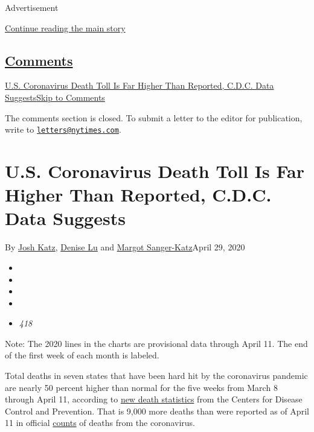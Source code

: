 Advertisement

\protect\hyperlink{after-top}{Continue reading the main story}

\hypertarget{comments}{%
\subsection{\texorpdfstring{\protect\hyperlink{commentsContainer}{Comments}}{Comments}}\label{comments}}

\href{}{U.S. Coronavirus Death Toll Is Far Higher Than Reported, C.D.C.
Data Suggests}\href{}{Skip to Comments}

The comments section is closed. To submit a letter to the editor for
publication, write to
\href{mailto:letters@nytimes.com}{\nolinkurl{letters@nytimes.com}}.

\hypertarget{us-coronavirus-death-toll-is-far-higher-than-reported-cdc-data-suggests}{%
\section{U.S. Coronavirus Death Toll Is Far Higher Than Reported, C.D.C.
Data
Suggests}\label{us-coronavirus-death-toll-is-far-higher-than-reported-cdc-data-suggests}}

By \href{https://www.nytimes.com/by/josh-katz}{Josh Katz},
\href{https://www.nytimes.com/by/denise-lu}{Denise Lu} and
\href{https://www.nytimes.com/by/margot-sanger-katz}{Margot
Sanger-Katz}April 29, 2020

\begin{itemize}
\item
\item
\item
\item
\item
  \emph{418}
\end{itemize}

Note: The 2020 lines in the charts are provisional data through April
11. The end of the first week of each month is labeled.

Total deaths in seven states that have been hard hit by the coronavirus
pandemic are nearly 50 percent higher than normal for the five weeks
from March 8 through April 11, according to
\href{https://www.cdc.gov/nchs/nvss/vsrr/covid_weekly/}{new death
statistics} from the Centers for Disease Control and Prevention. That is
9,000 more deaths than were reported as of April 11 in official
\href{https://www.nytimes.com/interactive/2020/us/coronavirus-us-cases.html}{counts}
of deaths from the coronavirus.

